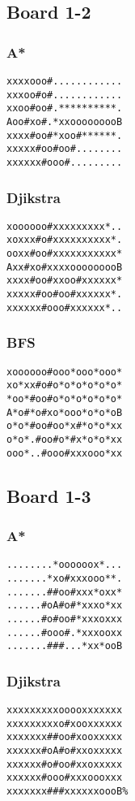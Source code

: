 \documentclass[11pt,a4paper]{article}
\begin{document}
\subsection*{Board 1-2}
\subsubsection*{A*}
\begin{lstlisting}
xxxxooo#............
xxxoo#o#............
xxoo#oo#.**********.
Aoo#xo#.*xxooooooooB
xxxx#oo#*xoo#******.
xxxxx#oo#oo#........
xxxxxx#ooo#.........
\end{lstlisting}

\subsubsection*{Djikstra}
\begin{lstlisting}
xoooooo#xxxxxxxxx*..
xoxxx#o#xxxxxxxxxx*.
ooxx#oo#xxxxxxxxxxx*
Axx#xo#xxxxooooooooB
xxxx#oo#xxoo#xxxxxx*
xxxxx#oo#oo#xxxxxx*.
xxxxxx#ooo#xxxxxx*..
\end{lstlisting}

\subsubsection*{BFS}
\begin{lstlisting}
xoooooo#ooo*ooo*ooo*
xo*xx#o#o*o*o*o*o*o*
*oo*#oo#o*o*o*o*o*o*
A*o#*o#xo*ooo*o*o*oB
o*o*#oo#oo*x#*o*o*xx
o*o*.#oo#o*#x*o*o*xx
ooo*..#ooo#xxxooo*xx
\end{lstlisting}

\subsection*{Board 1-3}
\subsubsection*{A*}
\begin{lstlisting}
........*oooooox*...
.......*xo#xxxooo**.
.......##oo#xxx*oxx*
......#oA#o#*xxxo*xx
......#o#oo#*xxxoxxx
......#ooo#.*xxxooxx
.......###...*xx*ooB
\end{lstlisting}
\subsubsection*{Djikstra}
\begin{lstlisting}
xxxxxxxxxooooxxxxxxx
xxxxxxxxxo#xooxxxxxx
xxxxxxx##oo#xooxxxxx
xxxxxx#oA#o#xxoxxxxx
xxxxxx#o#oo#xxoxxxxx
xxxxxx#ooo#xxxoooxxx
xxxxxxx###xxxxxxoooB%
\end{lstlisting}
\end{document}
